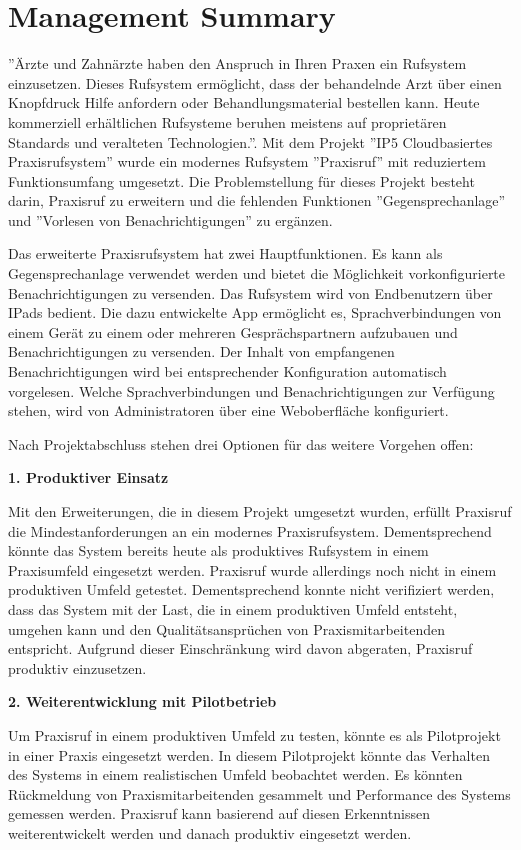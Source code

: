 \section*{Management Summary}

''Ärzte und Zahnärzte haben den Anspruch in Ihren Praxen ein Rufsystem einzusetzen.
Dieses Rufsystem ermöglicht, dass der behandelnde Arzt über einen Knopfdruck Hilfe anfordern oder Behandlungsmaterial bestellen kann.
Heute kommerziell erhältlichen Rufsysteme beruhen meistens auf proprietären Standards und veralteten Technologien.''\cite{aufgabenstellung}.
Mit dem Projekt ''IP5 Cloudbasiertes Praxisrufsystem'' wurde ein modernes Rufsystem ''Praxisruf'' mit reduziertem Funktionsumfang umgesetzt.
Die Problemstellung für dieses Projekt besteht darin, Praxisruf zu erweitern und die fehlenden Funktionen ''Gegensprechanlage'' und ''Vorlesen von Benachrichtigungen'' zu ergänzen.

Das erweiterte Praxisrufsystem hat zwei Hauptfunktionen.
Es kann als Gegensprechanlage verwendet werden und bietet die Möglichkeit vorkonfigurierte Benachrichtigungen zu versenden.
Das Rufsystem wird von Endbenutzern über IPads bedient.
Die dazu entwickelte App ermöglicht es, Sprachverbindungen von einem Gerät zu einem oder mehreren Gesprächspartnern aufzubauen und Benachrichtigungen zu versenden.
Der Inhalt von empfangenen Benachrichtigungen wird bei entsprechender Konfiguration automatisch vorgelesen.
Welche Sprachverbindungen und Benachrichtigungen zur Verfügung stehen, wird von Administratoren über eine Weboberfläche konfiguriert.

Nach Projektabschluss stehen drei Optionen für das weitere Vorgehen offen:

\textbf{1. Produktiver Einsatz}

Mit den Erweiterungen, die in diesem Projekt umgesetzt wurden, erfüllt Praxisruf die Mindestanforderungen an ein modernes Praxisrufsystem.
Dementsprechend könnte das System bereits heute als produktives Rufsystem in einem Praxisumfeld eingesetzt werden.
Praxisruf wurde allerdings noch nicht in einem produktiven Umfeld getestet.
Dementsprechend konnte nicht verifiziert werden, dass das System mit der Last, die in einem produktiven Umfeld entsteht, umgehen kann und den Qualitätsansprüchen von Praxismitarbeitenden entspricht.
Aufgrund dieser Einschränkung wird davon abgeraten, Praxisruf produktiv einzusetzen.

\textbf{2. Weiterentwicklung mit Pilotbetrieb}

Um Praxisruf in einem produktiven Umfeld zu testen, könnte es als Pilotprojekt in einer Praxis eingesetzt werden.
In diesem Pilotprojekt könnte das Verhalten des Systems in einem realistischen Umfeld beobachtet werden.
Es könnten Rückmeldung von Praxismitarbeitenden gesammelt und Performance des Systems gemessen werden.
Praxisruf kann basierend auf diesen Erkenntnissen weiterentwickelt werden und danach produktiv eingesetzt werden.

